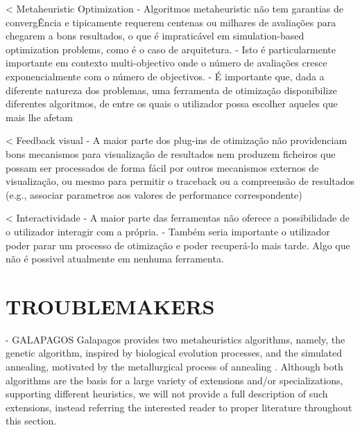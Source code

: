 < Metaheuristic Optimization
- Algoritmos metaheuristic não tem garantias de convergÊncia e tipicamente requerem centenas ou milhares de avaliações para chegarem a bons resultados, o que é impraticável em simulation-based optimization problems, como é o caso de arquitetura. 
- Isto é particularmente importante em contexto multi-objectivo onde o número de avaliações cresce exponencialmente com o número de objectivos.
- É importante que, dada a diferente natureza dos problemas, uma ferramenta de otimização disponibilize diferentes algoritmos, de entre os quais o utilizador possa escolher aqueles que mais lhe afetam

< Feedback visual
- A maior parte dos plug-ins de otimização não providenciam bons mecanismos para visualização de resultados nem produzem ficheiros que possam ser processados de forma fácil por outros mecanismos externos de visualização, ou mesmo para permitir o traceback ou a compreensão de resultados (e.g., associar parametros aos valores de performance correspondente)

< Interactividade
- A maior parte das ferramentas não oferece a possibilidade de o utilizador interagir com a própria. 
- Também seria importante o utilizador poder parar um processo de otimização e poder recuperá-lo mais tarde. Algo que não é possivel atualmente em nenhuma ferramenta.




\section{TROUBLEMAKERS}
- GALAPAGOS
Galapagos provides two metaheuristics algorithms, namely, the genetic algorithm, inspired by biological evolution processes, and the simulated annealing, motivated by the metallurgical process of annealing \cite{Brownlee2011}. Although both algorithms are the basis for a large variety of extensions and/or specializations, supporting different heuristics, we will not provide a full description of such extensions, instead referring the interested reader to proper literature throughout this section. 

